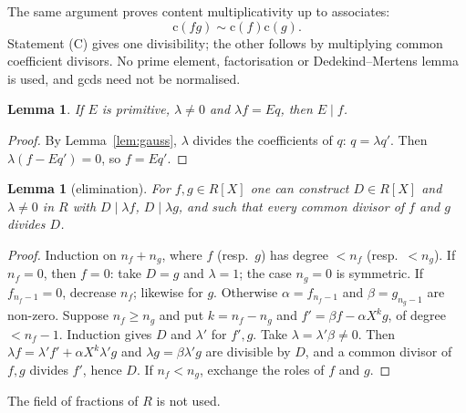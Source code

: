 \documentclass[11pt]{amsart}
\newtheorem{lemma}[theorem]{Lemma}
\theoremstyle{definition}
\theoremstyle{remark}
\newcommand{\cont}{\mathrm c}
\begin{document}
The same argument proves content multiplicativity up to associates:
\[
 \cont(fg)\sim\cont(f)\cont(g).
\]
Statement (C) gives one divisibility; the other follows by multiplying
common coefficient divisors. No prime element, factorisation or
Dedekind--Mertens lemma is used, and gcds need not be normalised.

\begin{lemma}\label{lem:divprim}
If $E$ is primitive, $\lambda\ne0$ and $\lambda f=Eq$, then $E\mid f$.
\end{lemma}
\begin{proof}
By Lemma~\ref{lem:gauss}, $\lambda$ divides the coefficients of $q$:
$q=\lambda q'$. Then $\lambda(f-Eq')=0$, so $f=Eq'$.
\end{proof}

\begin{lemma}[elimination]\label{lem:elim}
For $f,g\in R[X]$ one can construct $D\in R[X]$ and $\lambda\ne0$ in $R$
with $D\mid\lambda f$, $D\mid\lambda g$, and such that every common divisor
of $f$ and $g$ divides $D$.
\end{lemma}
\begin{proof}
Induction on $n_f+n_g$, where $f$ (resp.\ $g$) has degree $<n_f$
(resp.\ $<n_g$). If $n_f=0$, then $f=0$: take $D=g$ and $\lambda=1$; the
case $n_g=0$ is symmetric. If $f_{n_f-1}=0$, decrease $n_f$; likewise for
$g$. Otherwise $\alpha=f_{n_f-1}$ and $\beta=g_{n_g-1}$ are non-zero.
Suppose $n_f\ge n_g$ and put $k=n_f-n_g$ and $f'=\beta f-\alpha X^kg$, of
degree $<n_f-1$. Induction gives $D$ and $\lambda'$ for $f',g$. Take
$\lambda=\lambda'\beta\ne0$. Then $\lambda f=\lambda'f'+\alpha X^k\lambda'g$
and $\lambda g=\beta\lambda'g$ are divisible by $D$, and a common divisor
of $f,g$ divides $f'$, hence $D$. If $n_f<n_g$, exchange the roles of $f$
and $g$.
\end{proof}

The field of fractions of $R$ is not used.
\end{document}
